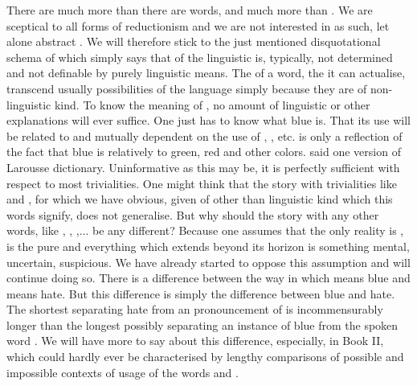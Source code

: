 \pa
There are much more  than there are words, and much more
 than . We are sceptical to all forms of reductionism
and we are not interested in  as such, let alone abstract
. We will therefore stick to 
the just mentioned disquotational schema of  which simply says that
 of the linguistic  is, typically, not determined and not
definable by purely linguistic means.  The  of a word, the
 it can actualise, transcend usually possibilities of the
language simply because they are of non-linguistic kind. To know the meaning of
, no amount of linguistic or other explanations will ever suffice. One
just has to know what blue is. That its use will be related to and mutually
dependent on the use of , , etc. is only a reflection of the
fact that blue is  relatively to green, red and other colors.
 said one version of Larousse
dictionary. Uninformative as this may be, it is perfectly sufficient with
respect to most trivialities.  One might think that the story with trivialities
like  and , for which we have obvious,  given
 of other than linguistic kind which this words signify, does
not generalise. But why should the story with any other words, like
, , ,... be any different?  Because one
assumes that the only reality is , is the pure 
and everything which extends beyond its horizon is something mental, uncertain,
suspicious. We have already started to oppose this assumption and will continue
doing so. There is a difference between the way in which  means blue
and  means hate. But this difference is simply the difference between
blue and hate. The shortest  separating hate from an 
pronouncement of  is incommensurably longer than the longest
 possibly separating an instance of blue from the 
spoken word . We will have more to say about this difference,
especially, in Book II, which could hardly ever be characterised by lengthy
comparisons of possible and impossible contexts of usage of the words 
and .  



